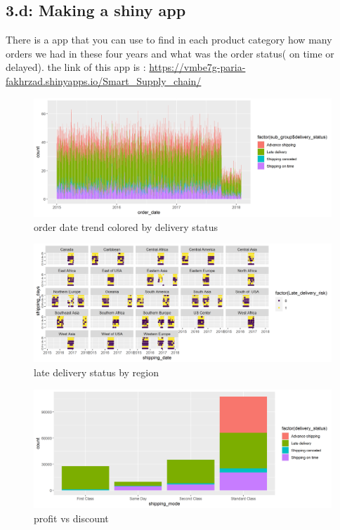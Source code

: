 \documentclass[a4paper, 11pt]{article}
\begin{document}
\subsection*{3.d: Making a shiny app}
There is a app that you can use to find in each product category how many orders we had in these four years and what was the order status( on time or delayed).
the link of this app is : \url{https://vmbe7g-paria-fakhrzad.shinyapps.io/Smart_Supply_chain/}


\begin{figure}[H]
	\includegraphics[width = \textwidth]{figure3a.png}
	\caption{order date trend colored by delivery status}
	\label{Figure3a}
\end{figure}
\begin{figure}[H]
	\includegraphics[width = \textwidth]{figure3b.png}
	\caption{late delivery status by region}
	\label{Figure3b}
\end{figure}
\begin{figure}[H]
	\includegraphics[width = \textwidth]{figure3c.png}
	\caption{profit vs discount}
	\label{Figure3c}
\end{figure}


\newpage


\end{document}
